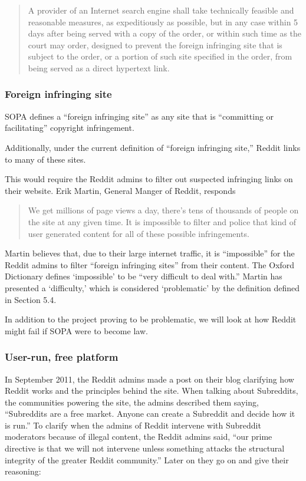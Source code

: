 \documentclass[11pt]{article}
\begin{document}
\begin{multicols}{2}
\begin{quote}A provider of an Internet search engine shall take technically feasible and reasonable measures, as expeditiously as possible, but in any case within 5 days after being served with a copy of the order, or within such time as the court may order, designed to prevent the foreign infringing site that is subject to the order, or a portion of such site specified in the order, from being served as a direct hypertext link.\cite[102.c.2.B]{sopa}\end{quote}

   \subsubsection{Foreign infringing site}

 SOPA defines a ``foreign infringing site'' as any site that is ``committing or facilitating'' copyright infringement.\cite[102.a.2]{sopa} 

Additionally, under the current definition of ``foreign infringing site,'' Reddit links to many of these sites.\cite{reddit-search-piratebay}

This would require the Reddit admins to filter out suspected infringing links on their website. Erik Martin, General Manger of Reddit, responds

\begin{quote}We get millions of page views a day, there's tens of thousands of people on the site at any given time. It is impossible to filter and police that kind of user generated content for all of these possible infringements.\cite{reddit-erik-interview}\end{quote}

Martin believes that, due to their large internet traffic, it is ``impossible'' for the Reddit admins to filter ``foreign infringing sites'' from their content. The Oxford Dictionary defines `impossible' to be ``very difficult to deal with.''\cite{def-impossible} Martin has presented a `difficulty,' which is considered `problematic' by the definition defined in Section 5.4.

In addition to the project proving to be problematic, we will look at how Reddit might fail if SOPA were to become law.

   \subsubsection{User-run, free platform}

In September 2011, the Reddit admins made a post on their blog clarifying how Reddit works and the principles behind the site.\cite{how-reddit-works} When talking about Subreddits, the communities powering the site, the admins described them saying, ``Subreddits are a free market. Anyone can create a Subreddit and decide how it is run.''\cite{how-reddit-works} To clarify when the admins of Reddit intervene with Subreddit moderators because of illegal content, the Reddit admins said, ``our prime directive is that we will not intervene unless something attacks the structural integrity of the greater Reddit community.''\cite{how-reddit-works} Later on they go on and give their reasoning:


\end{multicols}
\end{document}
